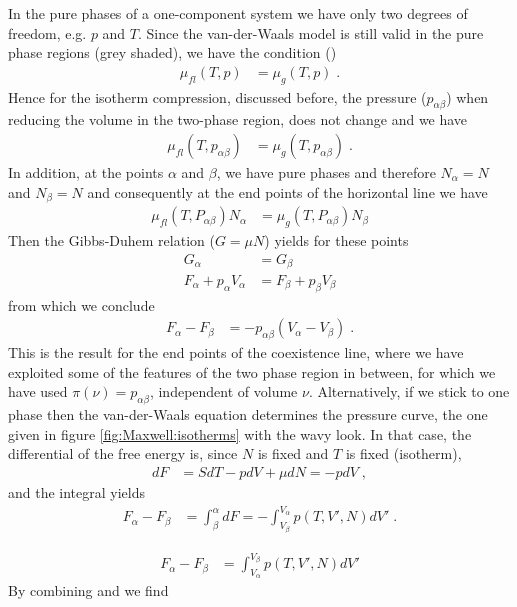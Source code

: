 In the pure phases of a one-component system we have only two degrees of freedom, e.g.
$p$ and $T$.
Since the van-der-Waals model is still valid in the pure phase regions (grey shaded),
we have the condition ()
%
\begin{align*}
\mu_{fl}(T,p) &= \mu_{g}(T,p)\;.
\end{align*}
%
Hence for the isotherm compression, discussed before, the pressure  ($p_{\alpha\beta}$) when reducing the volume in the two-phase region, does not change and we have
%
\begin{align*}
\mu_{fl}(T,p_{\alpha\beta}) &=\mu_{g}(T,p_{\alpha\beta})\;.
\end{align*}
%
In addition, at the points $\alpha$ and $\beta$, we have pure phases and therefore $N_{\alpha}=N$ and $N_{\beta}=N$ and consequently at the end points of the horizontal line we have
%
\begin{align*}
\mu_{fl}(T,P_{\alpha\beta}) N_{\alpha} &=\mu_{g}(T,P_{\alpha\beta}) N_{\beta}
\end{align*}
%
Then the Gibbs-Duhem relation ($G=\mu N$)  yields for these points
%
\begin{align*}
G_{\alpha} &= G_{\beta}\\
F_{\alpha} + p_{\alpha}V_{\alpha} &=F_{\beta} + p_{\beta} V_{\beta} 
\end{align*}
%
from which we conclude
%
\begin{align}\label{eq:DF:DV}
F_{\alpha}-F_{\beta} &= -p_{\alpha\beta}(V_{\alpha}-V_{\beta})\;.
\end{align}
%
This is the result for the end points of the coexistence line, where we have exploited some of the features of the  two phase region in between, for which we have used $\pi(\nu) = p_{\alpha\beta}$, independent of volume $\nu$.
Alternatively, if we stick to one phase then the van-der-Waals equation determines the pressure curve, the one given in figure \ref{fig:Maxwell:isotherms} with the wavy look.
In that case, the differential of the free energy is, since $N$ is fixed and $T$ is fixed (isotherm),
%
\begin{align*}
dF &= S dT - pdV +\mu dN = -pdV\;,
\end{align*}
%
and the integral yields
%
\begin{align*}
F_{\alpha}-F_{\beta} &= \int_{{\beta}}^{\alpha} dF =
- \int_{V_{\beta}}^{V_{\alpha}} p(T,V',N)  dV' \;.
\end{align*}
%

%
\begin{align}\label{eq:DF:DV:2}
F_{\alpha}-F_{\beta} &= \int_{V_{\alpha}}^{V_{\beta}} p(T,V',N)  dV' 
\end{align}
%
By combining  and  we find

